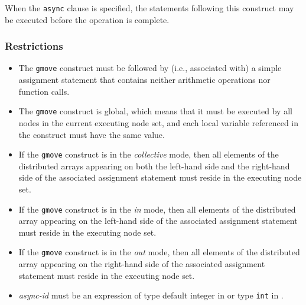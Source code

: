When the {\tt async} clause is specified, the statements following this
construct may be executed before the operation is complete.

\subsubsection*{Restrictions}

\begin{itemize}
 \item The {\tt gmove} construct must be followed by (i.e., associated
       with) a simple assignment statement that contains neither
       arithmetic operations nor function calls.
 \item The {\tt gmove} construct is global, which means that it must be
       executed by all nodes in the current executing node set, and each local
       variable referenced in the construct must have the same value.
 \item If the {\tt gmove} construct is in the {\it collective} mode, then
       all elements of the distributed arrays appearing on both the
       left-hand side and the right-hand side of the associated assignment
       statement must reside in the executing node set.
 \item If the {\tt gmove} construct is in the {\it in} mode, then
       all elements of the distributed array appearing on the left-hand side of the
       associated assignment statement must reside in the executing node
       set.
 \item If the {\tt gmove} construct is in the {\it out} mode, then
       all elements of the distributed array appearing on the right-hand side of the
       associated assignment statement must reside in the executing node
       set.
 \item {\it async-id} must be an expression of type default integer in
       {\XMPF} or type {\tt int} in {\XMPC}.
\end{itemize}

